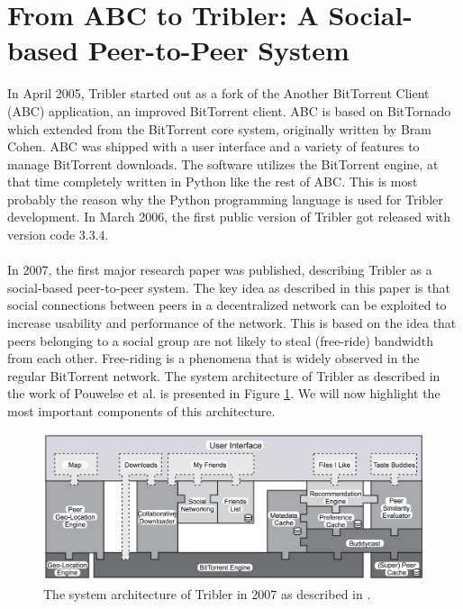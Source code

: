 \section{From ABC to Tribler: A Social-based Peer-to-Peer System}
In April 2005, Tribler started out as a fork of the Another BitTorrent Client (ABC) application, an improved BitTorrent client. ABC is based on BitTornado which extended from the BitTorrent core system, originally written by Bram Cohen. ABC was shipped with a user interface and a variety of features to manage BitTorrent downloads. The software utilizes the BitTorrent engine, at that time completely written in Python like the rest of ABC. This is most probably the reason why the Python programming language is used for Tribler development. In March 2006, the first public version of Tribler got released with version code 3.3.4.\\\\
In 2007, the first major research paper was published\cite{pouwelse2008tribler}, describing Tribler as a social-based peer-to-peer system. The key idea as described in this paper is that social connections between peers in a decentralized network can be exploited to increase usability and performance of the network. This is based on the idea that peers belonging to a social group are not likely to steal (free-ride) bandwidth from each other. Free-riding is a phenomena that is widely observed in the regular BitTorrent network. The system architecture of Tribler as described in the work of Pouwelse et al. is presented in Figure \ref{fig:tribler-architecture-2008}. We will now highlight the most important components of this architecture.

\begin{figure}[t]
	\centering
	\includegraphics[width=1.0\columnwidth]{images/tribler_architecture_2007}
	\caption{The system architecture of Tribler in 2007 as described in \cite{pouwelse2008tribler}.}
	\label{fig:tribler-architecture-2008}
\end{figure}


